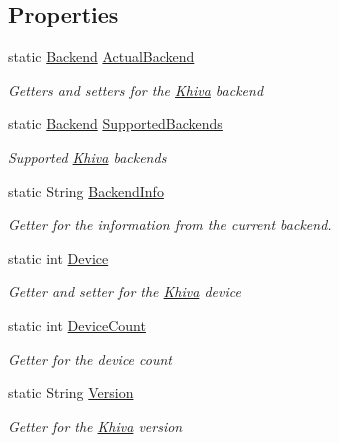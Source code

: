 \subsection*{Properties}
\begin{DoxyCompactItemize}
\item 
static \mbox{\hyperlink{classkhiva_1_1_khiva_a149c512eefcef84e8e94eca721d8cd8f}{Backend}} \mbox{\hyperlink{classkhiva_1_1_khiva_afe2a41bd88fb117ae27f5504438e25a2}{Actual\+Backend}}
\begin{DoxyCompactList}\small\item\em Getters and setters for the \mbox{\hyperlink{classkhiva_1_1_khiva}{Khiva}} backend \end{DoxyCompactList}\item 
static \mbox{\hyperlink{classkhiva_1_1_khiva_a149c512eefcef84e8e94eca721d8cd8f}{Backend}} \mbox{\hyperlink{classkhiva_1_1_khiva_ab4b9691c46e4db5099d7e182a3062a0f}{Supported\+Backends}}
\begin{DoxyCompactList}\small\item\em Supported \mbox{\hyperlink{classkhiva_1_1_khiva}{Khiva}} backends \end{DoxyCompactList}\item 
static String \mbox{\hyperlink{classkhiva_1_1_khiva_ad5c8679d21f7397030d5dd273e40d2f3}{Backend\+Info}}
\begin{DoxyCompactList}\small\item\em Getter for the information from the current backend. \end{DoxyCompactList}\item 
static int \mbox{\hyperlink{classkhiva_1_1_khiva_a099fd26a65c0f76e4ae9e5cc3c63377e}{Device}}
\begin{DoxyCompactList}\small\item\em Getter and setter for the \mbox{\hyperlink{classkhiva_1_1_khiva}{Khiva}} device \end{DoxyCompactList}\item 
static int \mbox{\hyperlink{classkhiva_1_1_khiva_add36612816a3c1921bea61c441833f46}{Device\+Count}}
\begin{DoxyCompactList}\small\item\em Getter for the device count \end{DoxyCompactList}\item 
static String \mbox{\hyperlink{classkhiva_1_1_khiva_ab4f011c19a19bdf3b1e4ff8c21df359b}{Version}}
\begin{DoxyCompactList}\small\item\em Getter for the \mbox{\hyperlink{classkhiva_1_1_khiva}{Khiva}} version \end{DoxyCompactList}\end{DoxyCompactItemize}


